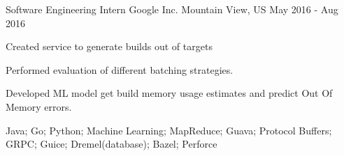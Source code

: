 

\begin{cventries}


  \cventry
    {Software Engineering Intern} %
    {Google Inc.} %
    {Mountain View, US} %
    {May 2016 - Aug 2016} %
    {
      \begin{cvitems} %
        \item {Created service to generate builds out of targets}
        \item {Performed evaluation of different batching strategies.}
        \item {Developed ML model get build memory usage estimates and predict Out Of Memory errors.}
        \item {Java; Go; Python; Machine Learning; MapReduce; Guava; Protocol Buffers; GRPC; Guice; Dremel(database); Bazel; Perforce}
      \end{cvitems}
    }

\end{cventries}
